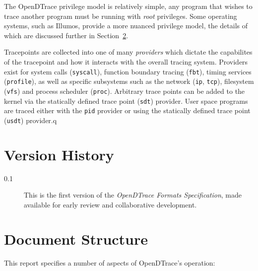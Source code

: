 The OpenDTrace privilege model is relatively simple, any program that
wishes to trace another program must be running with \emph{root}
privileges.  Some operating systems, such as Illumos, provide a more
nuanced privilege model, the details of which are discussed further in
Section~\ref{}.

Tracepoints are collected into one of many \emph{providers} which dictate
the capabilites of the tracepoint and how it interacts with the overall
tracing system.  Providers exist for system calls (\texttt{syscall}),
function boundary tracing (\texttt{fbt}), timing services (\texttt{profile}),
as well as specific subsystems such as the network (\texttt{ip}, \texttt{tcp}),
filesystem (\texttt{vfs}) and process scheduler (\texttt{proc}).
Arbitrary trace points can be added to the kernel via the
statically defined trace point (\texttt{sdt}) provider.  User space programs
are traced either with the \texttt{pid} provider or using the 
statically defined trace point (\texttt{usdt}) provider.q

\section{Version History}

\begin{description}
\item[0.1] This is the first version of the \textit{OpenDTrace Formats
  Specification}, made available for early review and collaborative
  development.
\end{description}

\section{Document Structure}

This report specifies a number of aspects of OpenDTrace's operation:

